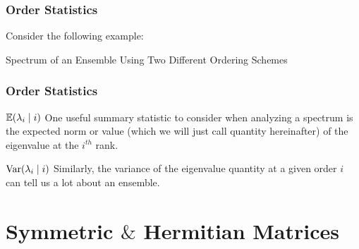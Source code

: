 
\begin{frame} \frametitle{Order Statistics}

Consider the following example:

{Spectrum of an Ensemble Using Two Different Ordering Schemes}

\end{frame}


\begin{frame} \frametitle{Order Statistics}

 $\mathbb{E}(\lambda_{i} \mid i)$ One useful summary statistic to consider when analyzing a spectrum is the expected norm or value (which we will just call quantity hereinafter) of the eigenvalue at the $i^{th}$ rank.

\medskip

 $\text{Var}(\lambda_{i} \mid i)$ Similarly, the variance of the eigenvalue quantity at a given order $i$ can tell us a lot about an ensemble.

\end{frame}






\section{Symmetric $\&$ Hermitian Matrices}

